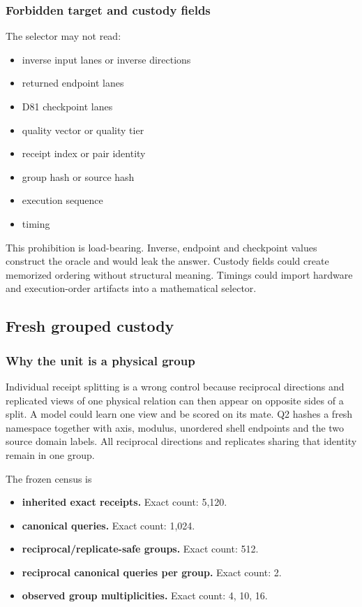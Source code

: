 \subsubsection{Forbidden target and custody
fields}\label{viii-ch07-forbidden-target-and-custody-fields}

The selector may not read:

\begin{itemize}
\tightlist
\item
  inverse input lanes or inverse directions
\item
  returned endpoint lanes
\item
  D81 checkpoint lanes
\item
  quality vector or quality tier
\item
  receipt index or pair identity
\item
  group hash or source hash
\item
  execution sequence
\item
  timing
\end{itemize}

This prohibition is load-bearing. Inverse, endpoint and checkpoint
values construct the oracle and would leak the answer. Custody fields
could create memorized ordering without structural meaning. Timings
could import hardware and execution-order artifacts into a mathematical
selector.

\subsection{Fresh grouped custody}\label{viii-ch07-fresh-grouped-custody}

\subsubsection{Why the unit is a physical
group}\label{viii-ch07-why-the-unit-is-a-physical-group}

Individual receipt splitting is a wrong control because reciprocal
directions and replicated views of one physical relation can then appear
on opposite sides of a split. A model could learn one view and be scored
on its mate. Q2 hashes a fresh namespace together with axis, modulus,
unordered shell endpoints and the two source domain labels. All
reciprocal directions and replicates sharing that identity remain in one
group.

The frozen census is

\begin{itemize}
\tightlist
\item
  \textbf{inherited exact receipts.} Exact count: 5,120.
\item
  \textbf{canonical queries.} Exact count: 1,024.
\item
  \textbf{reciprocal/replicate-safe groups.} Exact count: 512.
\item
  \textbf{reciprocal canonical queries per group.} Exact count: 2.
\item
  \textbf{observed group multiplicities.} Exact count: 4, 10, 16.
\end{itemize}

